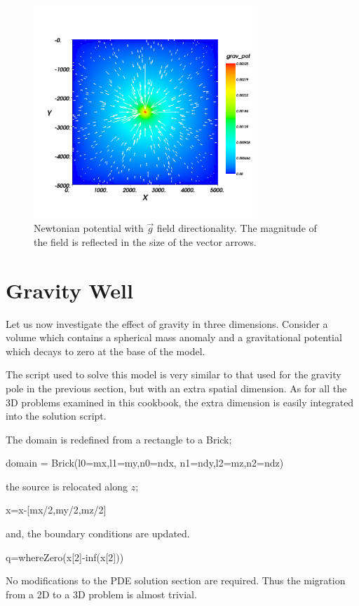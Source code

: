 \begin{figure}[ht]
\centering
\includegraphics[width=0.75\textwidth]{figures/ex10apot.png}
\caption{Newtonian potential with $\vec{g}$ field directionality. The magnitude
of the field is reflected in the size of the vector arrows.}
\label{fig:ex10pot}
\end{figure}
\clearpage

\section{Gravity Well}
Let us now investigate the effect of gravity in three dimensions. Consider a
volume which contains a spherical mass anomaly and a gravitational potential
which decays to zero at the base of the model.

The script used to solve this model is very similar to that used for the gravity
pole in the previous section, but with an extra spatial dimension. As for all
the 3D problems examined in this cookbook, the extra dimension is easily
integrated into the \esc solution script.

The domain is redefined from a rectangle to a Brick;
\begin{python}
domain = Brick(l0=mx,l1=my,n0=ndx, n1=ndy,l2=mz,n2=ndz)
\end{python}
the source is relocated along $z$;
\begin{python}
x=x-[mx/2,my/2,mz/2]
\end{python}
and, the boundary conditions are updated.
\begin{python}
q=whereZero(x[2]-inf(x[2]))
\end{python}
No modifications to the PDE solution section are required. Thus the migration
from a 2D to a 3D problem is almost trivial.

